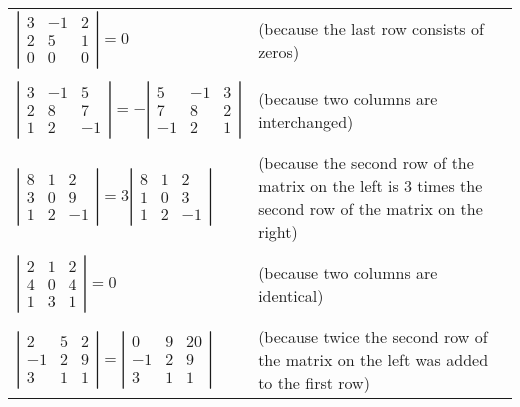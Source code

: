 \begin{tabu}{lX[2]}
$
\left|
\begin{array}{rrr}
3 & -1 & 2 \\
2 & 5 & 1 \\
0 & 0 & 0 
\end{array} \right|  =0$  & (because the last row consists of zeros) \\
\\
$ \left| \begin{array}{rrr}
3 & -1 & 5 \\
2 & 8 & 7 \\
1 & 2 & -1 
\end{array} \right| = - \left| \begin{array}{rrr}
5 & -1 & 3 \\
7 & 8 & 2 \\
-1 & 2 & 1 \end{array}\right|$ & (because two columns are interchanged) \\
\\
$
\left|
\begin{array}{rrr}
8 & 1 & 2 \\
3 & 0 & 9 \\
1 & 2 & -1 
\end{array} \right|
= 3 \left|
\begin{array}{rrr}
8 & 1 & 2 \\
1 & 0 & 3 \\
1 & 2 & -1 
\end{array} \right|$  &  (because the second row of the matrix on the left is $3$ times the second row of the matrix on the right) \\
\\
$
\left|
\begin{array}{rrr}
2 & 1 & 2 \\
4 & 0 & 4 \\
1 & 3 & 1 
\end{array} \right| =0$  & (because two columns are identical) \\
\\
$
\left|
\begin{array}{rrr}
2 & 5 & 2 \\
-1 & 2 & 9 \\
3 & 1 & 1 
\end{array} \right|
= \left|
\begin{array}{rrr}
0 & 9 & 20 \\
-1 & 2 & 9 \\
3 & 1 & 1 
\end{array} \right|$  &  (because twice the second row of the matrix on the left was added to the first row) \\
\end{tabu}

